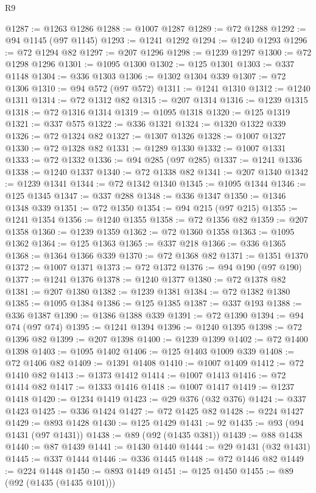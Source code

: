 \begin{lexlean}{R9}
\begin{coremodule}
@1287 := @1263 @1286
@1288 := @1007 @1287
@1289 := @72 @1288
@1292 := @94 @1145 (@97 @1145)
@1293 := @1241 @1292
@1294 := @1240 @1293
@1296 := @72 @1294 @82
@1297 := @207 @1296
@1298 := @1239 @1297
@1300 := @72 @1298 @1296
@1301 := @1095 @1300
@1302 := @125 @1301
@1303 := @337 @1148
@1304 := @336 @1303
@1306 := @1302 @1304 @339
@1307 := @72 @1306
@1310 := @94 @572 (@97 @572)
@1311 := @1241 @1310
@1312 := @1240 @1311
@1314 := @72 @1312 @82
@1315 := @207 @1314
@1316 := @1239 @1315
@1318 := @72 @1316 @1314
@1319 := @1095 @1318
@1320 := @125 @1319
@1321 := @337 @575
@1322 := @336 @1321
@1324 := @1320 @1322 @339
@1326 := @72 @1324 @82
@1327 := @1307 @1326
@1328 := @1007 @1327
@1330 := @72 @1328 @82
@1331 := @1289 @1330
@1332 := @1007 @1331
@1333 := @72 @1332
@1336 := @94 @285 (@97 @285)
@1337 := @1241 @1336
@1338 := @1240 @1337
@1340 := @72 @1338 @82
@1341 := @207 @1340
@1342 := @1239 @1341
@1344 := @72 @1342 @1340
@1345 := @1095 @1344
@1346 := @125 @1345
@1347 := @337 @288
@1348 := @336 @1347
@1350 := @1346 @1348 @339
@1351 := @72 @1350
@1354 := @94 @215 (@97 @215)
@1355 := @1241 @1354
@1356 := @1240 @1355
@1358 := @72 @1356 @82
@1359 := @207 @1358
@1360 := @1239 @1359
@1362 := @72 @1360 @1358
@1363 := @1095 @1362
@1364 := @125 @1363
@1365 := @337 @218
@1366 := @336 @1365
@1368 := @1364 @1366 @339
@1370 := @72 @1368 @82
@1371 := @1351 @1370
@1372 := @1007 @1371
@1373 := @72 @1372
@1376 := @94 @190 (@97 @190)
@1377 := @1241 @1376
@1378 := @1240 @1377
@1380 := @72 @1378 @82
@1381 := @207 @1380
@1382 := @1239 @1381
@1384 := @72 @1382 @1380
@1385 := @1095 @1384
@1386 := @125 @1385
@1387 := @337 @193
@1388 := @336 @1387
@1390 := @1386 @1388 @339
@1391 := @72 @1390
@1394 := @94 @74 (@97 @74)
@1395 := @1241 @1394
@1396 := @1240 @1395
@1398 := @72 @1396 @82
@1399 := @207 @1398
@1400 := @1239 @1399
@1402 := @72 @1400 @1398
@1403 := @1095 @1402
@1406 := @125 @1403 @1009 @339
@1408 := @72 @1406 @82
@1409 := @1391 @1408
@1410 := @1007 @1409
@1412 := @72 @1410 @82
@1413 := @1373 @1412
@1414 := @1007 @1413
@1416 := @72 @1414 @82
@1417 := @1333 @1416
@1418 := @1007 @1417
@1419 := @1237 @1418
@1420 := @1234 @1419
@1423 := @29 @376 (@32 @376)
@1424 := @337 @1423
@1425 := @336 @1424
@1427 := @72 @1425 @82
@1428 := @224 @1427
@1429 := @893 @1428
@1430 := @125 @1429
@1431 := 92
@1435 := @93 (@94 @1431 (@97 @1431))
@1438 := @89 (@92 (@1435 @381))
@1439 := @88 @1438
@1440 := @87 @1439
@1441 := @1430 @1440
@1444 := @29 @1431 (@32 @1431)
@1445 := @337 @1444
@1446 := @336 @1445
@1448 := @72 @1446 @82
@1449 := @224 @1448
@1450 := @893 @1449
@1451 := @125 @1450
@1455 := @89 (@92 (@1435 (@1435 @101)))

\end{coremodule}
\end{lexlean}
